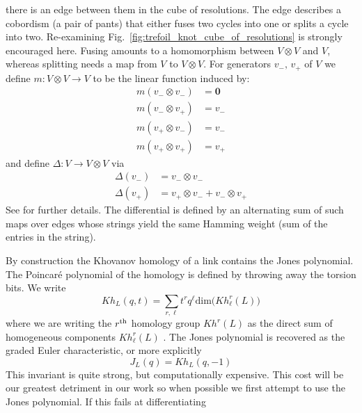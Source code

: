     there is an edge between them in the cube of resolutions.
    The edge describes a cobordism
    (a pair of pants) that either fuses two cycles into one or splits a cycle
    into two. Re-examining Fig.~\ref{fig:trefoil_knot_cube_of_resolutions} is
    strongly encouraged here. Fusing amounts to a homomorphism between
    $V\otimes{V}$ and $V$, whereas splitting needs a map from
    $V$ to $V\otimes{V}$. For generators $v_{-},\,v_{+}$ of $V$ we define
    $m:V\otimes{V}\rightarrow{V}$ to be the linear function induced by:
    \begin{align}
        m(v_{-}\otimes{v}_{-})&=\mathbf{0}\\
        m(v_{-}\otimes{v}_{+})&=v_{-}\\
        m(v_{+}\otimes{v}_{-})&=v_{-}\\
        m(v_{+}\otimes{v}_{+})&=v_{+}
    \end{align}
    and define $\Delta:V\rightarrow{V}\otimes{V}$ via
    \begin{align}
            \Delta(v_{-})&=v_{-}\otimes{v}_{-}\\
            \Delta(v_{+})&=v_{+}\otimes{v}_{-}+v_{-}\otimes{v}_{+}
    \end{align}
    See \cite[p.~343]{BarNatanKhovanovJones} for further details. The
    differential is defined by an alternating sum of such maps over edges whose
    strings yield the same Hamming weight (sum of the entries in the string).
    \par\hfill\par
    By construction the Khovanov homology of a link contains the Jones
    polynomial. The Poincar\'{e} polynomial of the homology is defined by
    throwing away the torsion bits. We write
    \begin{equation}
        \label{eqn:khovanov_polynomial}
        Kh_{L}(q,t)=
        \sum_{r,\ell}t^{r}q^{\ell}\textrm{dim}\big(Kh_{\ell}^{r}(L)\big)
    \end{equation}
    where we are writing the $r^{\small\textrm{th}}$ homology group
    $Kh^{r}(L)$ as the direct sum of homogeneous components
    $Kh_{\ell}^{r}(L)$ \cite{KatlasKhoHo}.
    The Jones polynomial is recovered as the graded Euler characteristic, or
    more explicitly
    \begin{equation}
        J_{L}(q)=Kh_{L}(q,-1)
    \end{equation}
    This invariant is quite strong, but computationally expensive. This cost
    will be our greatest detriment in our work so when possible we first
    attempt to use the Jones polynomial. If this fails at differentiating
